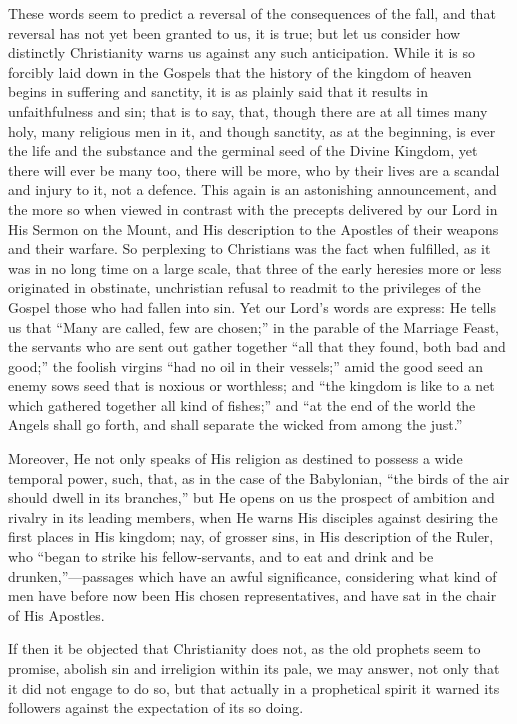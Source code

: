 These words seem to predict a reversal of the consequences of the
fall, and that reversal has not yet been granted to us, it is true;
but let us consider how distinctly Christianity warns us against any
such anticipation. While it is so forcibly laid down in the
Gospels that the history of the kingdom of heaven begins in suffering
and sanctity, it is as plainly said that it results in unfaithfulness
and sin; that is to say, that, though there are at all times many
holy, many religious men in it, and though sanctity, as at the
beginning, is ever the life and the substance and the germinal seed of
the Divine Kingdom, yet there will ever be many too, there will be
more, who by their lives are a scandal and injury to it, not a defence.
This again is an astonishing announcement, and the more so when viewed
in contrast with the precepts delivered by our Lord in His Sermon on
the Mount, and His description to the Apostles of their weapons and
their warfare. So perplexing to Christians was the fact when
fulfilled, as it was in no long time on a large scale, that three of
the early heresies more or less originated in obstinate, unchristian
refusal to readmit to the privileges of the Gospel those who had
fallen into sin. Yet our Lord's words are express: He tells us that
``Many are called, few are chosen;'' in the parable of the
Marriage Feast, the servants who are sent out gather together
``all that they found, both bad and good;'' the foolish
virgins ``had no oil in their vessels;'' amid the good seed an
enemy sows seed that is noxious or worthless; and ``the kingdom is
like to a net which gathered together all kind of fishes;'' and
``at the end of the world the Angels shall go forth, and shall
separate the wicked from among the just.''

Moreover, He not only speaks of His religion as destined to possess
a wide temporal power, such, that, as in the case of the
Babylonian, ``the birds of the air should dwell in its
branches,'' but He opens on us the prospect of ambition and
rivalry in its leading members, when He warns His disciples against
desiring the first places in His kingdom; nay, of grosser sins, in His
description of the Ruler, who ``began to strike his
fellow-servants, and to eat and drink and be drunken,''—passages
which have an awful significance, considering what kind of men have
before now been His chosen representatives, and have sat in the chair
of His Apostles.

If then it be objected that Christianity does not, as the old
prophets seem to promise, abolish sin and irreligion within its pale,
we may answer, not only that it did not engage to do so, but that
actually in a prophetical spirit it warned its followers against the
expectation of its so doing.

